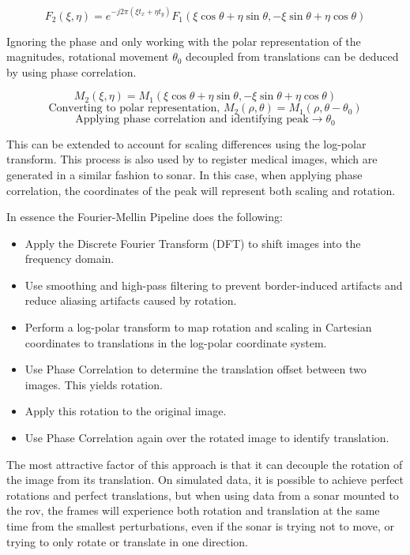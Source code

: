 \[F_2(\xi,\eta)=e^{-j2\pi(\xi t_x + \eta t_y)} F_1(\xi\cos{\theta} + \eta\sin{\theta},-\xi\sin{\theta} + \eta\cos{\theta})\]

Ignoring the phase and only working with the polar representation of the magnitudes, rotational movement \(\theta_0\) decoupled from translations can be deduced by using phase correlation.

\[M_2(\xi,\eta)=M_1(\xi\cos{\theta} + \eta\sin{\theta},-\xi\sin{\theta} + \eta\cos{\theta})\]
\[\mbox{Converting to polar representation, }M_2(\rho,\theta)=M_1(\rho,\theta - \theta_0)\]
\[\mbox{Applying phase correlation and identifying peak} \rightarrow \theta_0\]

This can be extended to account for scaling differences using the log-polar transform. This process is also used by \citeauthor{5396234}\cite{5396234} to register medical images, which are generated in a similar fashion to sonar. In this case, when applying phase correlation, the coordinates of the peak will represent both scaling and rotation.

In essence the Fourier-Mellin Pipeline does the following:

\begin{itemize}
    \item Apply the Discrete Fourier Transform (DFT) to shift images into the frequency domain.
    \item Use smoothing and high-pass filtering to prevent border-induced artifacts and reduce aliasing artifacts caused by rotation.
    \item Perform a log-polar transform to map rotation and scaling in Cartesian coordinates to translations in the log-polar coordinate system.
    \item Use Phase Correlation to determine the translation offset between two images. This yields rotation.
    \item Apply this rotation to the original image.
    \item Use Phase Correlation again over the rotated image to identify translation.
\end{itemize}

The most attractive factor of this approach is that it can decouple the rotation of the image from its translation. On simulated data, it is possible to achieve perfect rotations and perfect translations, but when using data from a sonar mounted to the \acrshort{rov}, the frames will experience both rotation and translation at the same time from the smallest perturbations, even if the sonar is trying not to move, or trying to only rotate or translate in one direction.


